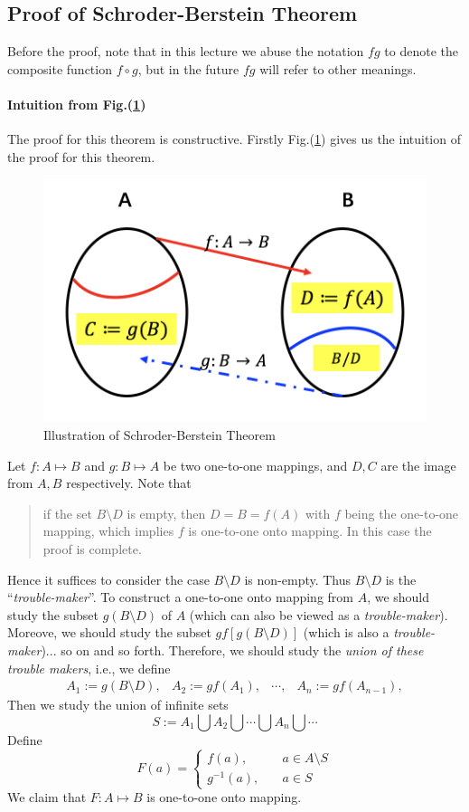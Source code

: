 \subsection{Proof of Schroder-Berstein Theorem}
Before the proof, note that in this lecture we abuse the notation $fg$ to denote the composite function $f\circ g$, but in the future $fg$ will refer to other meanings.
\paragraph{Intuition from Fig.(\ref{Fig:1:2})}
The proof for this theorem is constructive. Firstly Fig.(\ref{Fig:1:2}) gives us the intuition of the proof for this theorem. 
\begin{figure}
\centering
\includegraphics[width=0.65\linewidth]{week1/f_5}
\caption{Illustration of Schroder-Berstein Theorem}
\label{Fig:1:2}
\end{figure}
Let $f: A\mapsto B$ and $g: B\mapsto A$ be two one-to-one mappings, and $D,C$ are the image from $A,B$ respectively. Note that
\begin{quotation}
if the set $B\setminus D$ is empty, then $D=B=f(A)$ with $f$ being the one-to-one mapping, which implies $f$ is one-to-one onto mapping. In this case the proof is complete.
\end{quotation}
Hence it suffices to consider the case $B\setminus D$ is non-empty. Thus $B\setminus D$ is the ``\emph{trouble-maker}''. To construct a one-to-one onto mapping from $A$, we should study the subset $g(B\setminus D)$ of $A$ (which can also be viewed as a \textit{trouble-maker}). Moreove, we should study the subset $gf[g(B\setminus D)]$ (which is also a \textit{trouble-maker})... so on and so forth. Therefore, we should study the \textit{union of these trouble makers}, i.e., we define
\[
\begin{array}{llll}
A_1:=g(B\setminus D),
&
A_2:=gf(A_1),
&
\cdots,
&
A_{n}:=gf(A_{n-1}),
\end{array}
\]
Then we study the union of infinite sets
\[
S:=A_1\bigcup A_2\bigcup\cdots\bigcup A_n\bigcup\cdots
\]
Define
\[
F(a)=\left\{
\begin{aligned}
f(a),&\quad a\in A\setminus S\\
g^{-1}(a),&\quad a\in S
\end{aligned}
\right.
\]
We claim that $F:A\mapsto B$ is one-to-one onto mapping.
